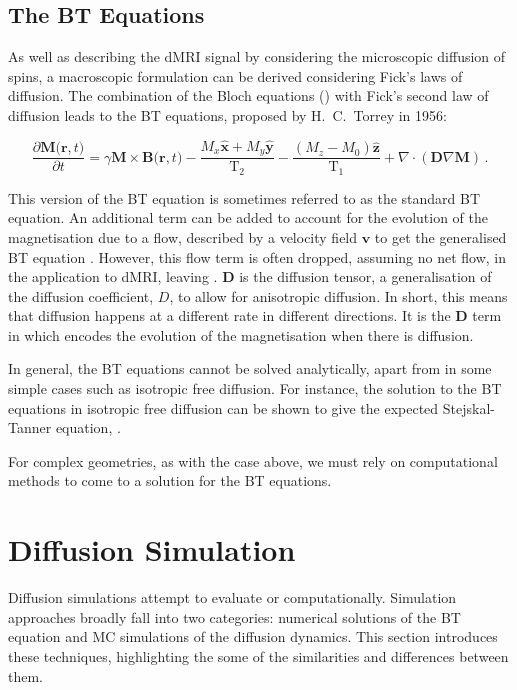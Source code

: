 \subsection{The \acl{BT} Equations}
\label{sec:bg_bloch_torrey}
As well as describing the \ac{dMRI} signal by considering the microscopic diffusion of spins, a macroscopic formulation can be derived considering Fick's laws of diffusion. The combination of the Bloch equations () with Fick's second law of diffusion leads to the \ac{BT} equations, proposed by H.\ C.\ Torrey in 1956\cite{Torrey1956,Callaghan1991,Price2009}:

\begin{equation}
  \frac{\partial\mathbf{M(r},t)}{\partial t} = \gamma \mathbf{M \times B(r}, t) - \frac{M_x\mathbf{\hat{x}} + M_y\mathbf{\hat{y}}}{\mathrm{T}_2} - \frac{(M_z - M_0)\mathbf{\hat{z}}}{\mathrm{T}_1} + \nabla \cdot \left(\mathbf{D} \nabla \mathbf{M}\right)\,.
  \label{eq:bloch_torrey}
\end{equation}

This version of the \ac{BT} equation is sometimes referred to as the standard \ac{BT} equation. An additional term can be added to account for the evolution of the magnetisation due to a flow, described by a velocity field $\mathbf{v}$ to get the generalised \ac{BT} equation \cite{Jeener2002,Beltrachini2016}. However, this flow term is often dropped, assuming no net flow, in the application to \ac{dMRI}, leaving . 
$\mathbf{D}$ is the diffusion tensor, a generalisation of the diffusion coefficient, $D$, to allow for anisotropic diffusion. In short, this means that diffusion happens at a different rate in different directions.
It is the $\mathbf{D}$ term in  which encodes the evolution of the magnetisation when there is diffusion.

In general, the \ac{BT} equations cannot be solved analytically, apart from in some simple cases such as isotropic free diffusion.
For instance, the solution to the \ac{BT} equations in isotropic free diffusion can be shown to give the expected Stejskal-Tanner equation,  \cite{Price1997}.

For complex geometries, as with the case above, we must rely on computational methods to come to a solution for the \ac{BT} equations. 



\section{Diffusion Simulation}
\label{sec:diffusion_simulation}
Diffusion simulations attempt to evaluate  or  computationally. Simulation approaches broadly fall into two categories: numerical solutions of the \ac{BT} equation and \ac{MC} simulations of the diffusion dynamics. This section introduces these techniques, highlighting the some of the similarities and differences between them. 


